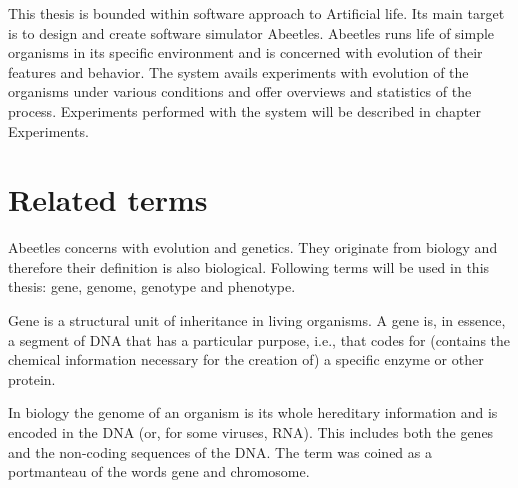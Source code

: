 \documentclass[a4paper,12pt]{report}
\begin{document}
This thesis is bounded within software approach to Artificial life. Its main target is to design and create software simulator Abeetles. Abeetles runs life of simple organisms in its specific environment and is concerned with evolution of their features and behavior. The system avails experiments with evolution of the organisms under various conditions and offer overviews and statistics of the process. Experiments performed with the system will be described in chapter Experiments.






\section{Related terms}
Abeetles concerns with evolution and genetics. They originate from biology and therefore their definition is also biological. Following terms will be used in this thesis: gene, genome, genotype and phenotype.

Gene is a structural unit of inheritance in living organisms. A gene is, in essence, a segment of DNA that has a particular purpose, i.e., that codes for (contains the chemical information necessary for the creation of) a specific enzyme or other protein.\cite{GeneDic}

In biology the genome of an organism is its whole hereditary information and is encoded in the DNA (or, for some viruses, RNA). This includes both the genes and the non-coding sequences of the DNA. The term was coined as a portmanteau of the words gene and chromosome.\cite{GenomeDef}
\end{document}
